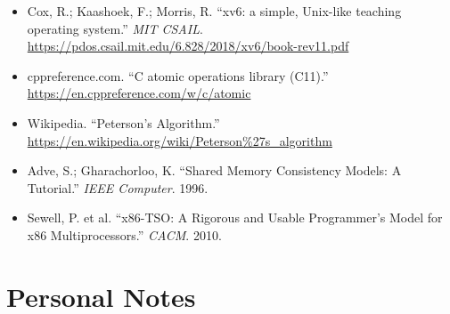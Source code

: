 \documentclass[11pt]{article}
\begin{document}
\begin{itemize}
    \item Cox, R.; Kaashoek, F.; Morris, R. ``xv6: a simple, Unix-like teaching operating system.'' \textit{MIT CSAIL}. \url{https://pdos.csail.mit.edu/6.828/2018/xv6/book-rev11.pdf}
    \item cppreference.com. ``C atomic operations library (C11).'' \url{https://en.cppreference.com/w/c/atomic}
    \item Wikipedia. ``Peterson's Algorithm.'' \url{https://en.wikipedia.org/wiki/Peterson%27s_algorithm}
    \item Adve, S.; Gharachorloo, K. ``Shared Memory Consistency Models: A Tutorial.'' \textit{IEEE Computer}. 1996.
    \item Sewell, P. et al. ``x86-TSO: A Rigorous and Usable Programmer's Model for x86 Multiprocessors.'' \textit{CACM}. 2010.
\end{itemize}

\section*{Personal Notes}
\end{document}
